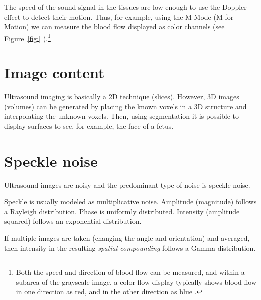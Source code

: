 The speed of the sound signal in the tissues are low enough to use the
Doppler effect to detect their motion. Thus, for example, using the
M-Mode (M for Motion) we can measure the blood flow displayed as color
channels (see Figure~\ref{fig:}
).\footnote{Both the speed
  and direction of blood flow can be measured, and within a subarea of
  the grayscale image, a color flow display typically shows blood flow
  in one direction as red, and in the other direction as blue
  \cite{bushberg2011essential}.}

\section{Image content}
Ultrasound imaging is basically a 2D technique (slices). However, 3D
images (volumes) can be generated by placing the known voxels in a 3D
structure and interpolating the unknown voxels. Then, using
segmentation it is possible to display surfaces to see, for example,
the face of a fetus.

\section{Speckle noise}
Ultrasound images are noisy and the predominant type of noise is
speckle noise.

Speckle is usually modeled as multiplicative noise. Amplitude
(magnitude) follows a Rayleigh distribution. Phase is uniformly
distributed. Intensity (amplitude squared) follows an exponential
distribution.

If multiple images are taken (changing the angle and orientation) and
averaged, then intensity in the resulting \emph{spatial compounding}
\cite{bushberg2011essential} follows a Gamma distribution.
